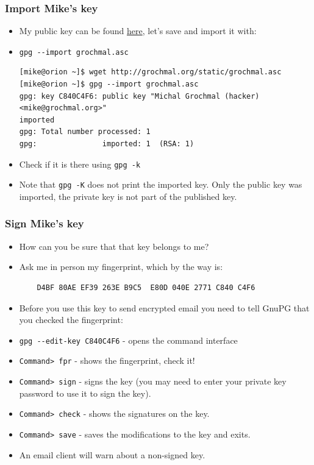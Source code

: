 \documentclass[hyperref={colorlinks=true}]{beamer}
\begin{document}
\begin{frame}[fragile]\frametitle{Import Mike's key}
  \begin{itemize}
    \item My public key can be found
\href{http://grochmal.org/static/grochmal.asc}{here}, let's save and import it
with:
    \item[] \verb|gpg --import grochmal.asc|
{\tiny
\begin{verbatim}
[mike@orion ~]$ wget http://grochmal.org/static/grochmal.asc
[mike@orion ~]$ gpg --import grochmal.asc
gpg: key C840C4F6: public key "Michal Grochmal (hacker) <mike@grochmal.org>"
imported
gpg: Total number processed: 1
gpg:               imported: 1  (RSA: 1)
\end{verbatim}
}
    \item Check if it is there using \verb|gpg -k|
    \item Note that \verb|gpg -K| does not print the imported key.  Only the
public key was imported, the private key is not part of the published key.
  \end{itemize}
\end{frame}

\begin{frame}[fragile]\frametitle{Sign Mike's key}
  \begin{itemize}
    \item How can you be sure that that key belongs to me?
    \item Ask me in person my fingerprint, which by the way is:
{\small
\begin{verbatim}
    D4BF 80AE EF39 263E B9C5  E80D 040E 2771 C840 C4F6
\end{verbatim}
}
    \item Before you use this key to send encrypted email you need to tell
GnuPG that you checked the fingerprint:
    \item[] \verb|gpg --edit-key C840C4F6| - opens the command interface
    \item[] \verb|Command> fpr| - shows the fingerprint, check it!
    \item[] \verb|Command> sign| - signs the key (you may need to enter your
private key password to use it to sign the key).
    \item[] \verb|Command> check| - shows the signatures on the key.
    \item[] \verb|Command> save| - saves the modifications to the key and
exits.
    \item An email client will warn about a non-signed key.
  \end{itemize}
\end{frame}
\end{document}
